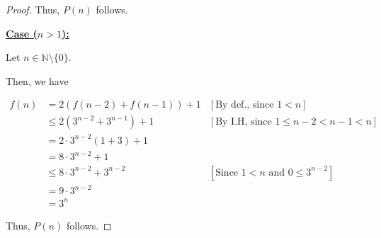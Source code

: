 \documentclass[12pt]{article}
\begin{document}
\begin{itemize}
\begin{proof}
        \bigskip

        Thus, $P(n)$ follows.

        \bigskip

        \underline{\textbf{Case ($n > 1$):}}

        \bigskip

        Let $n \in \mathbb{N} \setminus \{0\}$.

        \bigskip

        Then, we have

        \begin{align}
            f(n) &= 2(f(n-2) + f(n-1)) + 1 & [\text{By def., since $1 < n$}]\\
            &\leq 2(3^{n-2} + 3^{n-1}) + 1 & [\text{By I.H, since $1 \leq n-2 < n-1 < n$}]\\
            &= 2 \cdot 3^{n-2}(1 + 3) + 1\\
            &= 8 \cdot 3^{n-2} + 1 \\
            &\leq 8 \cdot 3^{n-2} + 3^{n-2} & [\text{Since $1 < n$ and $0 \leq 3^{n-2}$}]\\
            &= 9 \cdot 3^{n-2}\\
            &= 3^n
        \end{align}

        \bigskip

        Thus, $P(n)$ follows.
    \end{proof}
\end{itemize}









\end{document}
